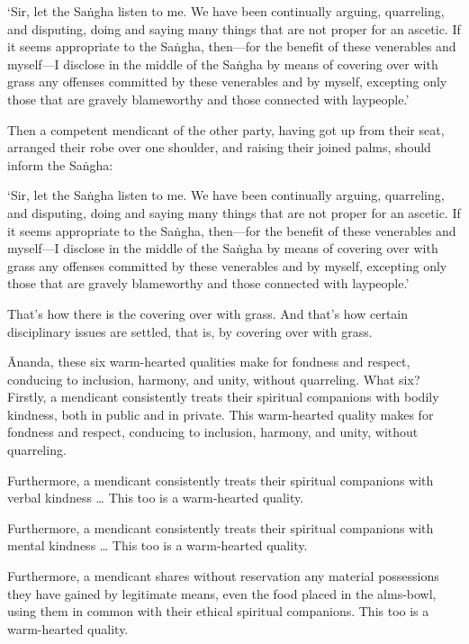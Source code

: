 \documentclass[12pt,openany]{book}%
\begin{document}
‘Sir, let the \textsanskrit{Saṅgha} listen to me. We have been continually arguing, quarreling, and disputing, doing and saying many things that are not proper for an ascetic. If it seems appropriate to the \textsanskrit{Saṅgha}, then—for the benefit of these venerables and myself—I disclose in the middle of the \textsanskrit{Saṅgha} by means of covering over with grass any offenses committed by these venerables and by myself, excepting only those that are gravely blameworthy and those connected with laypeople.’ 

Then a competent mendicant of the other party, having got up from their seat, arranged their robe over one shoulder, and raising their joined palms, should inform the \textsanskrit{Saṅgha}: 

‘Sir, let the \textsanskrit{Saṅgha} listen to me. We have been continually arguing, quarreling, and disputing, doing and saying many things that are not proper for an ascetic. If it seems appropriate to the \textsanskrit{Saṅgha}, then—for the benefit of these venerables and myself—I disclose in the middle of the \textsanskrit{Saṅgha} by means of covering over with grass any offenses committed by these venerables and by myself, excepting only those that are gravely blameworthy and those connected with laypeople.’ 

That’s how there is the covering over with grass. And that’s how certain disciplinary issues are settled, that is, by covering over with grass. 

Ānanda, these six warm-hearted qualities make for fondness and respect, conducing to inclusion, harmony, and unity, without quarreling. What six? Firstly, a mendicant consistently treats their spiritual companions with bodily kindness, both in public and in private. This warm-hearted quality makes for fondness and respect, conducing to inclusion, harmony, and unity, without quarreling. 

Furthermore, a mendicant consistently treats their spiritual companions with verbal kindness … This too is a warm-hearted quality. 

Furthermore, a mendicant consistently treats their spiritual companions with mental kindness … This too is a warm-hearted quality. 

Furthermore, a mendicant shares without reservation any material possessions they have gained by legitimate means, even the food placed in the alms-bowl, using them in common with their ethical spiritual companions. This too is a warm-hearted quality. 
\end{document}
